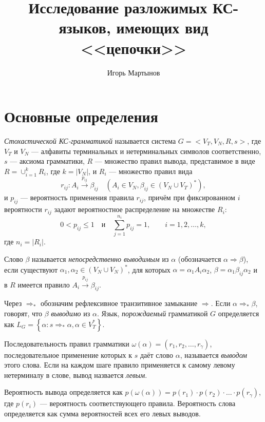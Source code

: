 \documentclass[11pt]{article}
\title{Исследование разложимых КС-языков, имеющих вид <<цепочки>>}
\author{Игорь Мартынов}
\begin{document}
\setlength{\parindent}{0pt}
\setlength{\parskip}{8pt}

\maketitle

\section{Основные определения}

\textit{Стохастической КС-грамматикой} называется система $G = <V_T, V_N, R, s>$, где $V_T$ и $V_N$ --- алфавиты терминальных и нетерминальных символов соответственно, $s$ --- аксиома грамматики, $R$ --- множество правил вывода, представимое в виде $R = \cup_{i = 1}^k R_i$, где $k = |V_N|$, и $R_i$ --- множество правил вида
\begin{equation}
    r_{ij} : A_i \xrightarrow{p_{ij}} \beta_{ij}\quad{}\left( A_i \in V_N, \beta_{ij} \in (V_N \cup V_T)^* \right),
\end{equation}
и $p_{ij}$ --- вероятность применения правила $r_{ij}$, причём при фиксированном $i$ вероятности $r_{ij}$ задают вероятностное распределение на множестве $R_i$:
\begin{equation}
    0 < p_{ij} \leqslant 1\quad\text{и}\quad\sum_{j = 1}^{n_i} p_{ij} = 1,\qquad{}i = 1,2,\ldots,k,
\end{equation}
где $n_i = |R_i|$.

Слово $\beta$ называется \textit{непосредственно выводимым} из $\alpha$ (обозначается $\alpha \Rightarrow \beta$), если существуют $\alpha_1, \alpha_2 \in (V_N \cup V_N)^*$, для которых $\alpha = \alpha_1 A_i \alpha_2$, $\beta = \alpha_1 \beta_{ij} \alpha_2$ и в $R$ имеется правило $A_i \xrightarrow{p_{ij}} \beta_{ij}$.

Через $\Rightarrow_*$ обозначим рефлексивное транзитивное замыкание $\Rightarrow$. Если $\alpha \Rightarrow_* \beta$, говорят, что $\beta$ \textit{выводимо} из $\alpha$. Язык, \textit{порождаемый} грамматикой $G$ определяется как $L_G = \left\{ \alpha : s \Rightarrow_* \alpha, \alpha \in V_T^* \right\}$.

Последовательность правил грамматики $\omega(\alpha) = (r_1, r_2, \ldots, r_\gamma)$, последовательное применение которых к $s$ даёт слово $\alpha$, называется \textit{выводом} этого слова. Если на каждом шаге правило применяется к самому левому нетерминалу в слове, вывод назвается \textit{левым}.

Вероятность вывода определяется как $p(\omega(\alpha)) = p(r_1) \cdot p(r_2) \cdot \ldots \cdot p(r_\gamma)$, где $p(r_i)$ --- вероятность соответствующего правила. Вероятность слова определяется как сумма вероятностей всех его левых выводов.
\end{document}
